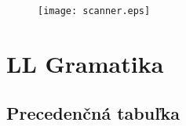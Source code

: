 \documentclass[12pt,a4paper,titlepage,final]{article}
\begin{document}
\begin{figure}[H]
\begin{center}
	\texttt{[image: scanner.eps]}
	\label{fig:scanner}
\end{center}
\end{figure}

%
\section{LL Gramatika} \label{gramatika}



%
\clearpage
\begin{landscape}
	\section{Precedenčná tabuľka} \label{precedencna_tabulka}
	
\end{landscape}
\clearpage
\newpage
\end{document}

